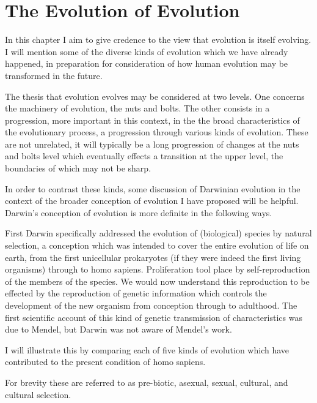 \chapter{The Evolution of Evolution}\label{EvolutionOfEvolution}

In this chapter I aim to give credence to the view that evolution is itself evolving.
I will mention some of the diverse kinds of evolution which we have already happened, in preparation for consideration of how human evolution may be transformed in the future.

The thesis that evolution evolves may be considered at two levels.
One concerns the machinery of evolution, the nuts and bolts.
The other consists in a progression, more important in this context, in the the broad characteristics of the evolutionary process, a progression through various kinds of evolution.
These are not unrelated, it will typically be a long progression of changes at the nuts and bolts level which eventually effects a transition at the upper level, the boundaries of which may not be sharp.

In order to contrast these kinds, some discussion of Darwinian evolution in the context of the broader conception of evolution I have proposed will be helpful.
Darwin's conception of evolution is more definite in the following ways.

First Darwin specifically addressed the evolution of (biological) species by natural selection, a conception which was intended to cover the entire evolution of life on earth, from the first unicellular prokaryotes (if they were indeed the first living organisms) through to homo sapiens.
Proliferation tool place by self-reproduction of the members of the species.
We would now understand this reproduction to be effected by the reproduction of genetic information which controls the development of the new organism from conception through to adulthood.
The first scientific account of this kind of genetic transmission of characteristics was due to Mendel, but Darwin was not aware of Mendel's work. 

I will illustrate this by comparing each of five kinds of evolution which have contributed to the present condition of homo sapiens.

For brevity these are referred to as pre-biotic, asexual, sexual, cultural, and cultural selection.

